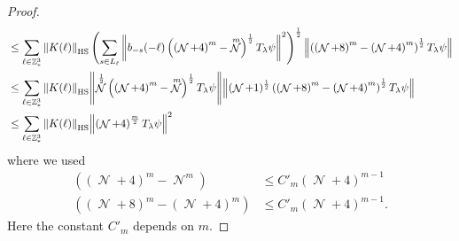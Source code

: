 \documentclass[sn-mathphys, Numbered ,a4paper]{sn-jnl}%
\DeclareMathOperator{\Z}{\mathbb{Z}}
\DeclareMathOperator{\HH}{\mathcal{H}}
\DeclareMathOperator{\KK}{\mathcal{K}}
\DeclareMathOperator{\NN}{\mathcal{N}}
\newcommand{\half}{\frac{1}{2}}
\newcommand{\eva}[1]{\left\langle #1 \right\rangle}
\newcommand{\di}{\mathrm{d}}
\theoremstyle{plain}
\theoremstyle{definition}
\theoremstyle{remark}
\theoremstyle{plain}
\theoremstyle{definition}
\theoremstyle{remark}
\begin{document}
\begin{proof}
\begin{align}
	&\leq \sum\limits_{\ell\in \mathbb{Z}^3_*} \norm{K(\ell)}_{\mathrm{HS}}\left(\sum\limits_{s\in L_\ell} \norm{  b_{-s}(-\ell) \left( \left(\NN+4\right)^m - \NN^m \right)^\half T_{\lambda}\psi}^2\right)^\half \norm{ \left( \left(\NN+8\right)^m - \left(\NN+4\right)^m \right)^\half T_{\lambda}\psi }\nonumber\\
	&\leq \sum\limits_{\ell\in \mathbb{Z}^3_*} \norm{K(\ell)}_{\mathrm{HS}}\norm{ \NN^\half \left( \left(\NN+4\right)^m - \NN^m \right)^\half T_{\lambda}\psi} \norm{ (\NN+1)^\half \left( \left(\NN+8\right)^m - \left(\NN+4\right)^m \right)^\half T_{\lambda}\psi }\nonumber\\
	&\leq \sum\limits_{\ell\in \mathbb{Z}^3_*} \norm{K(\ell)}_{\mathrm{HS}}\norm{ \left(\NN+4\right)^\frac{m}{2} T_{\lambda}\psi}^2
\end{align}
where we used
\begin{align}
	\left( \left(\NN+4\right)^m - \NN^m \right) &\leq C'_m \left(\NN+4\right)^{m-1} \\
	\left( \left(\NN+8\right)^m - \left(\NN+4\right)^m \right) &\leq  C'_m \left(\NN+4\right)^{m-1}.
\end{align}
Here the constant $C'_m$ depends on $m$. 
    \begin{comment} 
    For a given $\Psi \in \HH_N$, we start with taking a derivative of the expectation of the LHS of \eqref{eq:gronest} above.
    \begin{align}
        \left|\frac{\di}{\di\lambda}\eva{\Psi, (T^*_{\lambda}(\mathcal{N} +1)T_{\lambda})\Psi }\right| 
        &= \left|\eva{\Psi,(T^*_{\lambda}\left[\KK,\NN\right]T_{\lambda}) \Psi}\right|\nonumber\\
        &= \abs{4\mathrm{Re} \eva{T_\lambda\Psi,\sum\limits_{\ell \in \Z^3_*}\sum\limits_{r,s \in L_{\ell}}K(\ell)_{r,s} b^*_{-s}(-\ell)b^*_{r}(\ell)T_\lambda\Psi}}\nonumber\\
        &\leq 4 \sum\limits_{\ell \in \Z^3_*} \abs{\eva{\sum\limits_{s \in L_{\ell}}b_{-s}(-\ell) T_\lambda\Psi,\sum\limits_{r \in L_{\ell}}K(\ell)_{r,s} b^*_{r}(\ell)T_\lambda\Psi}}\label{eq:diffeva}
    \end{align}
    Then using Cauchy-Schwarz inequality and the estimates from Lemma \ref{lem:pairest}, we get
    \begin{align}
        (\ref{eq:diffeva}) &\leq 4\sum\limits_{\ell \in \Z^3_*}\sum\limits_{s \in L_{\ell}} \norm{b_{-s}(-\ell) T_\lambda\Psi} \norm{\sum\limits_{r \in L_{\ell}}K(\ell)_{r,s} b^*_{r}(\ell)T_\lambda\Psi} \nonumber\\
        &\leq 4 \sum\limits_{\ell \in \Z^3_*} \norm{K(\ell)}_{\mathrm{HS}}\norm{\NN^\half T_\lambda\Psi}\norm{(\NN+1)^\half T_\lambda\Psi}\nonumber\\

\end{comment}
\end{proof}
\end{document}

